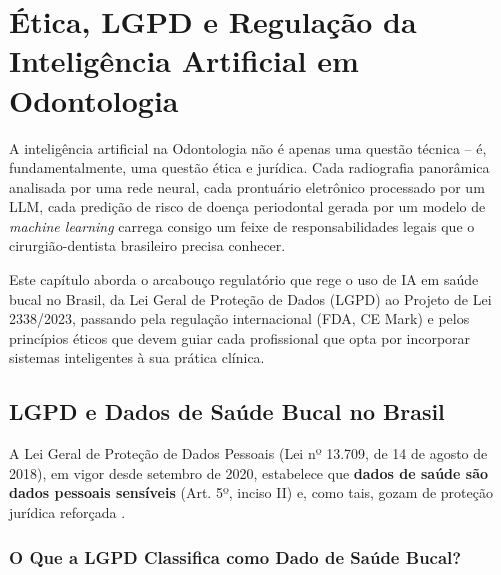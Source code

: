 \chapter{Ética, LGPD e Regulação da Inteligência Artificial em Odontologia}
\label{cap:etica-lgpd-regulacao}

\nivelcinco

A inteligência artificial na Odontologia não é apenas uma questão técnica --
é, fundamentalmente, uma questão ética e jurídica. Cada radiografia panorâmica
analisada por uma rede neural, cada prontuário eletrônico processado por um
LLM, cada predição de risco de doença periodontal gerada por um modelo de
\textit{machine learning} carrega consigo um feixe de responsabilidades legais
que o cirurgião-dentista brasileiro precisa conhecer.

Este capítulo aborda o arcabouço regulatório que rege o uso de IA em saúde
bucal no Brasil, da Lei Geral de Proteção de Dados (LGPD) ao Projeto de Lei
2338/2023, passando pela regulação internacional (FDA, CE Mark) e pelos
princípios éticos que devem guiar cada profissional que opta por incorporar
sistemas inteligentes à sua prática clínica.

   

\section{LGPD e Dados de Saúde Bucal no Brasil}
\label{sec:lgpd-saude-bucal}

\nivelquatro

A Lei Geral de Proteção de Dados Pessoais (Lei nº 13.709, de 14 de agosto de
2018), em vigor desde setembro de 2020, estabelece que \textbf{dados de saúde
são dados pessoais sensíveis} (Art. 5º, inciso II) e, como tais, gozam de
proteção jurídica reforçada \cite{brasil2018lgpd}.


\subsection{O Que a LGPD Classifica como Dado de Saúde Bucal?}

